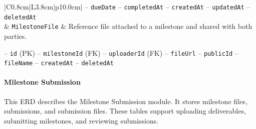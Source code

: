 \begin{center}
\begin{longtable}{|C{0.8cm}|L{3.8cm}|p{10.0cm}|}
\hspace*{1em}-- \texttt{due\allowbreak Date} \newline
\hspace*{1em}-- \texttt{completed\allowbreak At} \newline
\hspace*{1em}-- \texttt{created\allowbreak At} \newline
\hspace*{1em}-- \texttt{updated\allowbreak At} \newline
\hspace*{1em}-- \texttt{deleted\allowbreak At} \\
 & \texttt{Milestone\allowbreak File} & Reference file attached to a milestone and shared with both parties.\par\smallskip
\hspace*{1em}-- \texttt{id} (PK) \newline
\hspace*{1em}-- \texttt{milestone\allowbreak Id} (FK) \newline
\hspace*{1em}-- \texttt{uploader\allowbreak Id} (FK) \newline
\hspace*{1em}-- \texttt{file\allowbreak Url} \newline
\hspace*{1em}-- \texttt{public\allowbreak Id} \newline
\hspace*{1em}-- \texttt{file\allowbreak Name} \newline
\hspace*{1em}-- \texttt{created\allowbreak At} \newline
\hspace*{1em}-- \texttt{deleted\allowbreak At} \\
\hline
\end{longtable}\addtocounter{table}{-1}
\end{center}

\paragraph{Milestone Submission}

This ERD describes the Milestone Submission module. It stores milestone files, submissions, and submission files. These tables support uploading deliverables, submitting milestones, and reviewing submissions.

